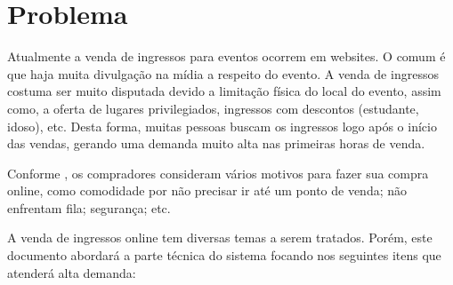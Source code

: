 \chapter{Problema}

Atualmente a venda de ingressos para eventos ocorrem em websites.
O comum é que haja muita divulgação na mídia a respeito do evento.
A venda de ingressos costuma ser muito disputada devido a limitação
física do local do evento, assim como, a oferta de
lugares privilegiados, ingressos com descontos (estudante, idoso), etc.
Desta forma, muitas pessoas buscam os ingressos logo após o início das
vendas, gerando uma demanda muito alta nas primeiras horas de venda.

Conforme \cite{10-motivos-para-vender-online}, os compradores consideram
vários motivos para fazer sua compra online, como comodidade por não
precisar ir até um ponto de venda; não enfrentam fila; segurança; etc.

A venda de ingressos online
tem diversas temas a serem tratados. Porém, este documento abordará a parte
técnica do sistema focando nos seguintes itens que atenderá alta demanda:

